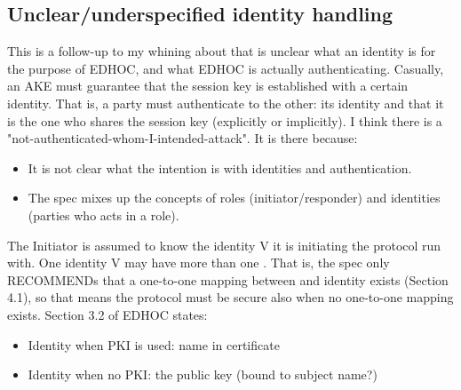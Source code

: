 \documentclass[a4paper,11pt]{article}
\theoremstyle{plain}
\theoremstyle{plain}
\begin{document}
\subsection{Unclear/underspecified identity handling}
%
This is a follow-up to my whining about that is unclear what an identity is
for the purpose of EDHOC, and what EDHOC is actually authenticating.
%
Casually, an AKE must guarantee that the session key is established with a
certain identity.
%
That is, a party must authenticate to the other: its identity and that it is
the one who shares the session key (explicitly or implicitly).
%
I think there is a "not-authenticated-whom-I-intended-attack".
%
It is there because:
\begin{itemize}
    \item It is not clear what the intention is with identities and
            authentication.
    \item The spec mixes up the concepts of roles (initiator/responder) and
        identities (parties who acts in a role).
\end{itemize}
%
The Initiator is assumed to know the identity V it is initiating the protocol
run with.
%
One identity V may have more than one .
%
That is, the spec only RECOMMENDs that a one-to-one mapping between
and identity exists (Section 4.1), so that means the protocol must be secure
also when no one-to-one mapping exists.
%
Section 3.2 of EDHOC states:
\begin{itemize}
    \item Identity when PKI is used: name in certificate
    \item Identity when no PKI: the public key (bound to subject name?)
\end{itemize}
\end{document}
